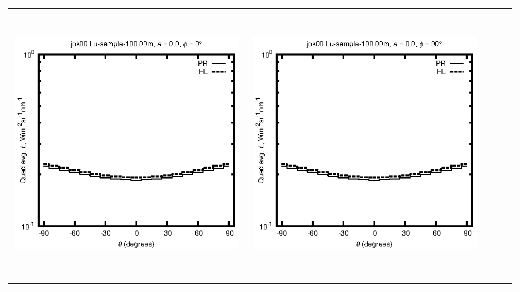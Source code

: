 \documentclass[10pt,a4paper]{article}
\begin{document}
\begin{adjustwidth}{-1.2in}{-1.2in}
\begin{tabular}{c c c c}
\includegraphics[height=7cm]{../eps/jok00_Lu_sample_100.00m_fwd.eps} &
\includegraphics[height=7cm]{../eps/jok00_Lu_sample_100.00m_cross.eps} \\
\end{tabular}

\pagebreak


\end{adjustwidth}
\end{document}
